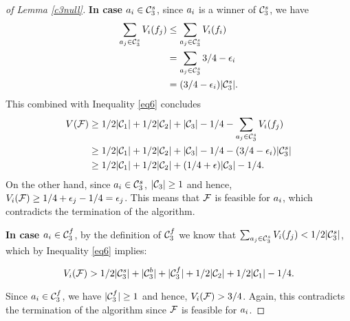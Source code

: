 \begin{proof}[of Lemma \ref{c3null}]
\textbf{In case $a_i \in \mathcal{C}_3^s$}, since $a_i$ is a winner of $\mathcal{C}_3^s$, we have 
\begin{equation}
\begin{split}
\sum_{a_j \in \mathcal{C}_3^s} V_i(f_j) & \leq \sum_{a_j \in \mathcal{C}_3^s}  V_i(f_i)\\
& = \sum_{a_j \in \mathcal{C}_3^s} 3/4 - \epsilon_i\\
& = ({3/4}-\epsilon_i) |\mathcal{C}_3^s|.
\end{split}
\end{equation}
This combined with Inequality \eqref{eq6} concludes
\begin{equation*}
\begin{split}
 V(\mathcal{F}) &\geq  1/2 |\mathcal{C}_1| + 1/2 |\mathcal{C}_2| + |\mathcal{C}_3| -1/4 - \sum_{a_j \in \mathcal{C}_3^s} V_i(f_j)\\
 & \geq 1/2 |\mathcal{C}_1| + 1/2 |\mathcal{C}_2| + |\mathcal{C}_3| - 1/4 - ({3/4}-\epsilon_i) |\mathcal{C}_3^s|\\
 & \geq 1/2 |\mathcal{C}_1| + 1/2 |\mathcal{C}_2| + (1/4 + \epsilon) |\mathcal{C}_3| - 1/4.
\end{split}
\end{equation*}
On the other hand, since $a_i \in \mathcal{C}_3^s$, $|\mathcal{C}_3| \geq 1$ and hence, $V_i({\mathcal{F}}) \geq {1/4} + \epsilon_j - {1/4} = \epsilon_j$. This means that $\mathcal{F}$ is feasible for $a_i$, which contradicts the termination of the algorithm. 

\textbf{In case $a_i \in \mathcal{C}_3^f$}, by the definition of $\mathcal{C}_3^f$ we know that $\sum_{a_j \in \mathcal{C}_3^s} V_i(f_j) < {1/2} |\mathcal{C}_3^s|$, which by Inequality \eqref{eq6} implies:

$$V_i({\mathcal{F}}) > {1/2}|\mathcal{C}_3^s| + |\mathcal{C}_3^b| + |\mathcal{C}_3^f| + {1/2}|\mathcal{C}_2| + {1/2}|\mathcal{C}_1|-1/4.$$

Since $a_i \in \mathcal{C}_3^f$, we have $|\mathcal{C}_3^f| \geq 1$ and hence, $V_i({\mathcal{F}}) > 3/4$. Again, this contradicts the termination of the algorithm since $\mathcal{F}$ is feasible for $a_i$.  
\end{proof}

